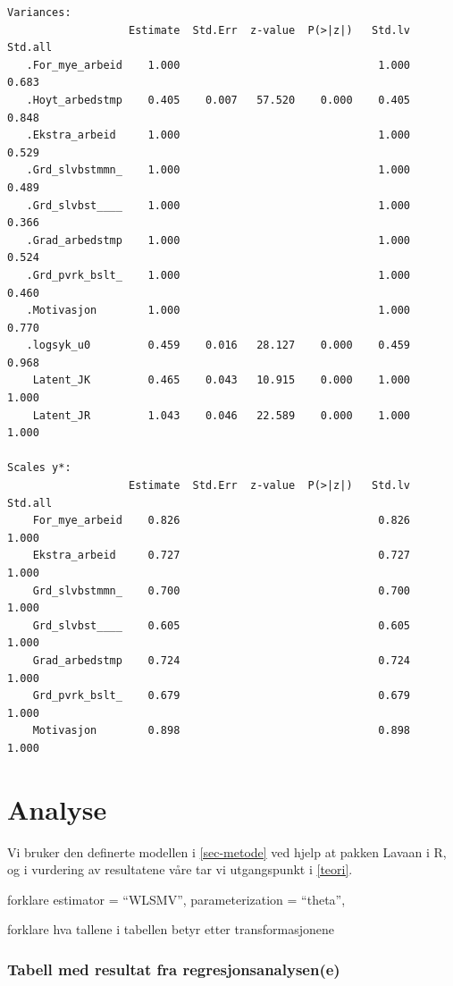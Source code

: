 \documentclass[
  12pt,
  a4paper,
  DIV=11,
  numbers=noendperiod]{scrartcl}
\begin{document}
\begin{verbatim}
Variances:
                   Estimate  Std.Err  z-value  P(>|z|)   Std.lv  Std.all
   .For_mye_arbeid    1.000                               1.000    0.683
   .Hoyt_arbedstmp    0.405    0.007   57.520    0.000    0.405    0.848
   .Ekstra_arbeid     1.000                               1.000    0.529
   .Grd_slvbstmmn_    1.000                               1.000    0.489
   .Grd_slvbst____    1.000                               1.000    0.366
   .Grad_arbedstmp    1.000                               1.000    0.524
   .Grd_pvrk_bslt_    1.000                               1.000    0.460
   .Motivasjon        1.000                               1.000    0.770
   .logsyk_u0         0.459    0.016   28.127    0.000    0.459    0.968
    Latent_JK         0.465    0.043   10.915    0.000    1.000    1.000
    Latent_JR         1.043    0.046   22.589    0.000    1.000    1.000

Scales y*:
                   Estimate  Std.Err  z-value  P(>|z|)   Std.lv  Std.all
    For_mye_arbeid    0.826                               0.826    1.000
    Ekstra_arbeid     0.727                               0.727    1.000
    Grd_slvbstmmn_    0.700                               0.700    1.000
    Grd_slvbst____    0.605                               0.605    1.000
    Grad_arbedstmp    0.724                               0.724    1.000
    Grd_pvrk_bslt_    0.679                               0.679    1.000
    Motivasjon        0.898                               0.898    1.000
\end{verbatim}

\newpage

\section{Analyse}\label{analyse}

Vi bruker den definerte modellen i \ref{sec-metode} ved hjelp at pakken
Lavaan i R, og i vurdering av resultatene våre tar vi utgangspunkt i
\ref{teori}.

forklare estimator = ``WLSMV'', parameterization = ``theta'',

forklare hva tallene i tabellen betyr etter transformasjonene

\subsubsection{Tabell med resultat fra
regresjonsanalysen(e)}\label{tabell-med-resultat-fra-regresjonsanalysene}
\end{document}
